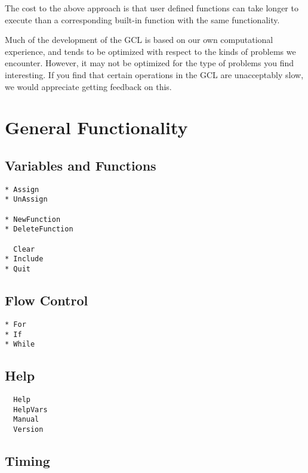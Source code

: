 The cost to the above approach is that user defined functions can take
longer to execute than a corresponding built-in function with the same
functionality.

Much of the development of the GCL is based on our own computational
experience, and tends to be optimized with respect to the kinds of
problems we encounter.  However, it may not be optimized
for the type of problems you find interesting.  If you find that
certain operations in the GCL are unacceptably slow, we would
appreciate getting feedback on this.

\section{General Functionality}

\subsection{Variables and Functions}

\begin{multicols}{3}
\begin{verbatim}
* Assign 
* UnAssign 

* NewFunction
* DeleteFunction

  Clear 
* Include
* Quit
\end{verbatim}
\end{multicols}

\subsection{Flow Control}

\begin{multicols}{3}
\begin{verbatim}
* For
* If
* While
\end{verbatim}
\end{multicols}

\subsection{Help}

\begin{multicols}{3}
\begin{verbatim}
  Help 
  HelpVars 
  Manual 
  Version 
\end{verbatim}
\end{multicols}


\subsection{Timing}

